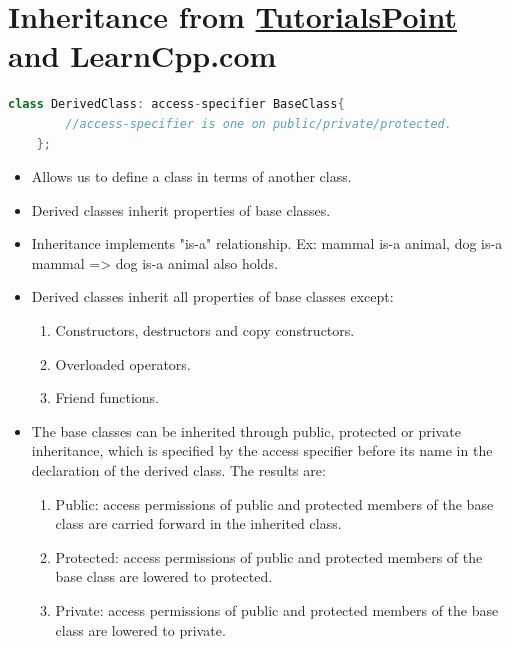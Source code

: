 \documentclass{report}
\begin{document}
\section{Inheritance from \href{https://www.tutorialspoint.com/cplusplus/cpp_inheritance.htm}{TutorialsPoint} and LearnCpp.com}
\begin{lstlisting}[language=C++,caption=Syntax]
    class DerivedClass: access-specifier BaseClass{
        //access-specifier is one on public/private/protected.
    };
\end{lstlisting}
\begin{itemize}
    \item Allows us to define a class in terms of another class.
    \item Derived classes inherit properties of base classes.
    \item Inheritance implements "is-a" relationship. Ex: mammal is-a animal, dog is-a mammal => dog is-a animal also holds.
    \item Derived classes inherit all properties of base classes except:
    \begin{enumerate}
        \item Constructors, destructors and copy constructors.
        \item Overloaded operators.
        \item Friend functions.
    \end{enumerate}
    \item The base classes can be inherited through public, 
    protected or private inheritance, which is specified by the 
    access specifier before its name in the declaration of the 
    derived class. The results are:
    \begin{enumerate}
        \item Public: access permissions of public and protected members of the base class are carried forward in the inherited class.
        \item Protected: access permissions of public and protected members of the base class are lowered to protected.
        \item Private: access permissions of public and protected members of the base class are lowered to private.
    \end{enumerate}
\end{itemize}
\end{document}
